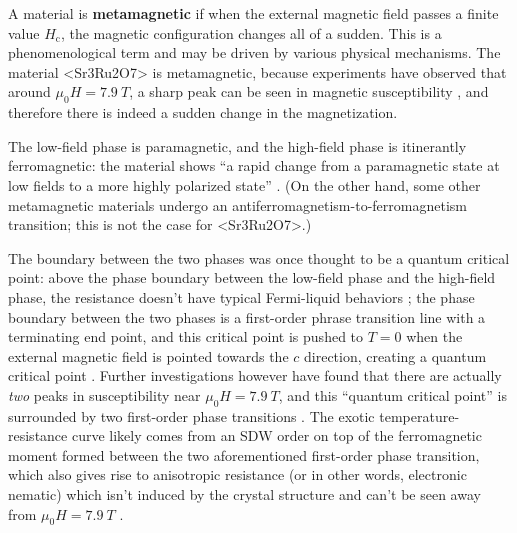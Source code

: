 \documentclass[hyperref, a4paper]{article}
\newcommand*{\concept}[1]{{\textbf{#1}}}
\def\ce#1{<#1>}%
\begin{document}
A material is \concept{metamagnetic} if 
when the external magnetic field passes a finite value $H_{\text{c}}$,
the magnetic configuration changes all of a sudden.
This is a phenomenological term 
and may be driven by various physical mechanisms.
The material \ce{Sr3Ru2O7} is metamagnetic, 
because experiments have observed that 
around $\mu_0 H = \SI{7.9}{T}$, 
a sharp peak can be seen in magnetic susceptibility
\cite{grigera2004disorder},
and therefore there is indeed a sudden change in the magnetization.

The low-field phase is paramagnetic, 
and the high-field phase is itinerantly ferromagnetic:
the material shows 
``a rapid change from a paramagnetic state at low fields to
a more highly polarized state'' \cite{perry2001metamagnetism}.
(On the other hand, some other metamagnetic materials 
undergo an antiferromagnetism-to-ferromagnetism transition;
this is not the case for \ce{Sr3Ru2O7}.)

The boundary between the two phases was once thought to be a quantum critical point:
above the phase boundary between the low-field phase and the high-field phase,
the resistance doesn't have typical Fermi-liquid behaviors
\cite{perry2001metamagnetism};
the phase boundary between the two phases 
is a first-order phrase transition line with a terminating end point, 
and this critical point is pushed to $T = 0$
when the external magnetic field is pointed towards the $c$ direction,
creating a quantum critical point \cite{grigera2003angular}.
Further investigations however have found 
that there are actually \emph{two} peaks in susceptibility 
near $\mu_0 H =\SI{7.9}{T}$, 
and this ``quantum critical point'' is surrounded by two first-order phase transitions
\cite{kitagawa2005metamagnetic,grigera2004disorder}.
The exotic temperature-resistance curve likely comes from 
an SDW order on top of the ferromagnetic moment
formed between the two aforementioned first-order phase transition,
which also gives rise to anisotropic resistance
(or in other words, electronic nematic)
which isn't induced by the crystal structure
and can't be seen away from $\mu_0 H =\SI{7.9}{T}$
\cite{lester2015field,borzi2007formation}.

\subsection{}
\end{document}
